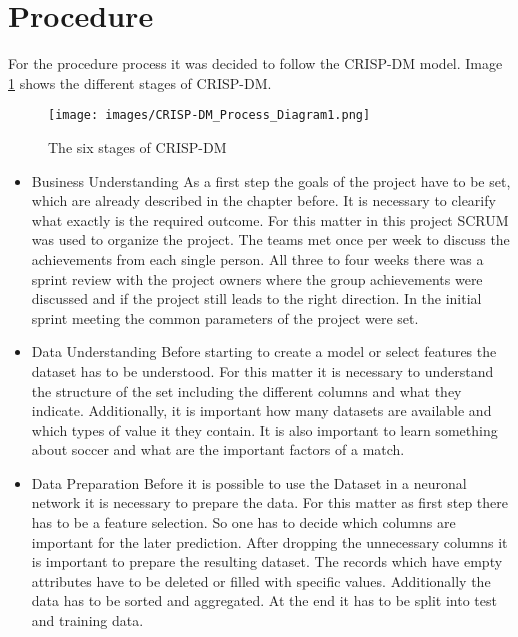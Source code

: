 \section{Procedure}

For the procedure process it was decided to follow the CRISP-DM model. Image \ref{CRISPImage} shows the different stages of CRISP-DM.

\begin{figure}[h]
\centering
\texttt{[image: images/CRISP-DM\_Process\_Diagram1.png]}
\caption{The six stages of CRISP-DM \cite{CRISPDig:2012}}
\label{CRISPImage}
\end{figure}

\begin{itemize}
\item Business Understanding \newline
As a first step the goals of the project have to be set, which are already described in the chapter before. It is necessary to clearify what exactly is the required outcome. For this matter in this project SCRUM was used to organize the project. The teams met once per week to discuss the achievements from each single person. All three to four weeks there was a sprint review with the project owners where the group achievements were discussed and if the project still leads to the right direction. In the initial sprint meeting the common parameters of the project were set.
\item Data Understanding \newline
Before starting to create a model or select features the dataset has to be understood. For this matter it is necessary to understand the structure of the set including the different columns and what they indicate. Additionally, it is important how many datasets are available and which types of value it they contain. It is also important to learn something about soccer and what are the important factors of a match.
\item Data Preparation \newline
Before it is possible to use the Dataset in a neuronal network it is necessary to prepare the data. For this matter as first step there has to be a feature selection. So one has to decide which columns are important for the later prediction. After dropping the unnecessary columns it is important to prepare the resulting dataset. The records which have empty attributes have to be deleted or filled with specific values. Additionally the data has to be sorted and aggregated. At the end it has to be split into test and training data. 

\end{itemize}
